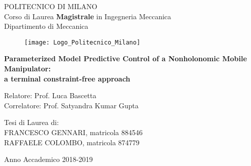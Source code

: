 \thispagestyle{empty}
\vspace*{-2cm} \bfseries{
\begin{center}
  \large
  POLITECNICO DI MILANO\\
  \normalsize
  Corso di Laurea \textbf{Magistrale} in Ingegneria Meccanica\\
  Dipartimento di Meccanica\\
  \vspace*{0.8cm}
  \begin{figure}[htbp]
    \begin{center}
      \texttt{[image: Logo\_Politecnico\_Milano]}
	 \centering
    \end{center}
  \end{figure}
  \vspace*{0.25cm} \Large


  \textbf{Parameterized Model Predictive Control of a Nonholonomic Mobile Manipulator: \\ a terminal constraint-free approach}\\


\end{center}
\vspace*{1.3cm} \large
\begin{flushleft}

  Relatore: Prof. Luca Bascetta \\
  Correlatore: Prof. Satyandra Kumar Gupta\\ 

\end{flushleft}
\vspace*{1.4cm}
\begin{flushright}
\normalsize

  Tesi di Laurea di:\\ FRANCESCO GENNARI, matricola 884546 \\
                        RAFFAELE COLOMBO, matricola 874779 \\

\end{flushright}
\vspace*{1.23cm}
\begin{center}


  Anno Accademico 2018-2019
\end{center} \clearpage
}
